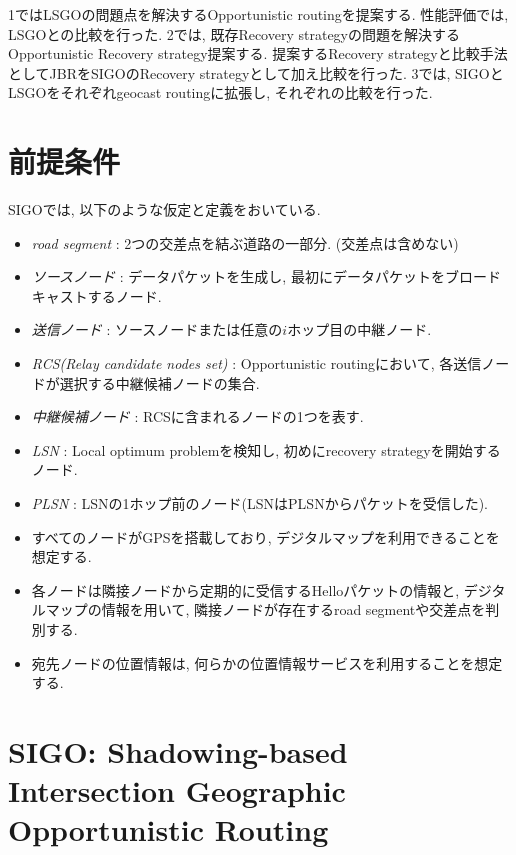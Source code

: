 \documentclass[10pt]{jreport}
\begin{document}
1ではLSGOの問題点を解決するOpportunistic routingを提案する. 性能評価では, LSGOとの比較を行った. 2では, 既存Recovery strategyの問題を解決するOpportunistic Recovery strategy提案する. 提案するRecovery strategyと比較手法としてJBRをSIGOのRecovery strategyとして加え比較を行った.
3では, SIGOとLSGOをそれぞれgeocast routingに拡張し, それぞれの比較を行った.

\section{前提条件}
SIGOでは, 以下のような仮定と定義をおいている. 

\begin{itemize}
	\item  \textit{road segment} : 2つの交差点を結ぶ道路の一部分. (交差点は含めない)
	\item \textit{ソースノード} : データパケットを生成し, 最初にデータパケットをブロードキャストするノード. 
	\item  \textit{送信ノード} : ソースノードまたは任意の$i$ホップ目の中継ノード.
	\item  \textit{RCS(Relay candidate nodes set)} : Opportunistic routingにおいて, 各送信ノードが選択する中継候補ノードの集合. 
	\item  \textit{中継候補ノード} : RCSに含まれるノードの1つを表す. 
	\item  \textit{LSN} : Local optimum problemを検知し, 初めにrecovery strategyを開始するノード.
	\item  \textit{PLSN} : LSNの1ホップ前のノード(LSNはPLSNからパケットを受信した).
	\item すべてのノードがGPSを搭載しており, デジタルマップを利用できることを想定する. 
	\item 各ノードは隣接ノードから定期的に受信するHelloパケットの情報と, デジタルマップの情報を用いて, 隣接ノードが存在するroad segmentや交差点を判別する.
	\item 宛先ノードの位置情報は, 何らかの位置情報サービスを利用することを想定する. 
\end{itemize}




\section{SIGO: Shadowing-based Intersection Geographic Opportunistic Routing}
\label{SIGO}
\end{document}
